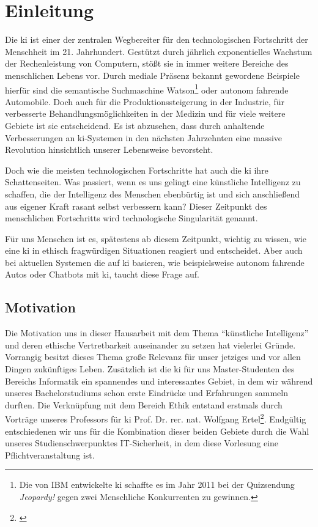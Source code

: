 \section{Einleitung}
Die \ac{ki} ist einer der zentralen Wegbereiter für den technologischen Fortschritt der Menschheit im 21. Jahrhundert.
Gestützt durch jährlich exponentielles Wachstum der Rechenleistung von Computern, stößt sie in immer weitere Bereiche des menschlichen Lebens vor.
Durch mediale Präsenz bekannt gewordene Beispiele hierfür sind die semantische Suchmaschine Watson\footnote{Die von IBM entwickelte \ac{ki} schaffte es im Jahr 2011 bei der Quizsendung \textit{Jeopardy!} gegen zwei Menschliche Konkurrenten zu gewinnen.} oder autonom fahrende Automobile. %
Doch auch für die Produktionssteigerung in der Industrie, für verbesserte Behandlungsmöglichkeiten in der Medizin und für viele weitere Gebiete ist sie entscheidend.
Es ist abzusehen, dass durch anhaltende Verbesserungen an \ac{ki}-Systemen in den nächsten Jahrzehnten eine massive Revolution hinsichtlich unserer Lebensweise bevorsteht.

Doch wie die meisten technologischen Fortschritte hat auch die \ac{ki} ihre Schattenseiten.
Was passiert, wenn es uns gelingt eine künstliche Intelligenz zu schaffen, die der Intelligenz des Menschen ebenbürtig ist und sich anschließend aus eigener Kraft rasant selbst verbessern kann?
Dieser Zeitpunkt des menschlichen Fortschritts wird technologische Singularität genannt.

Für uns Menschen ist es, spätestens ab diesem Zeitpunkt, wichtig zu wissen, wie eine \ac{ki} in ethisch fragwürdigen Situationen reagiert und entscheidet. Aber auch bei aktuellen Systemen die auf \ac{ki} basieren, wie beispielsweise autonom fahrende Autos oder Chatbots mit \ac{ki}, taucht diese Frage auf. 

\subsection{Motivation}
Die Motivation uns in dieser Hausarbeit mit dem Thema \enquote{künstliche Intelligenz} und deren ethische Vertretbarkeit auseinander zu setzen hat vielerlei Gründe. 
Vorrangig besitzt dieses Thema große Relevanz für unser jetziges und vor allen Dingen zukünftiges Leben. 
Zusätzlich ist die \ac{ki} für uns Master-Studenten des Bereichs Informatik ein spannendes und interessantes Gebiet, in dem wir während unseres Bachelorstudiums schon erste Eindrücke und Erfahrungen sammeln durften.
Die Verknüpfung mit dem Bereich Ethik entstand erstmals durch Vorträge unseres Professors für \ac{ki} Prof. Dr. rer. nat. Wolfgang Ertel\footnote{\cite{ProfessorErtel}}. Endgültig entschiedenen wir uns für die Kombination dieser beiden Gebiete durch die Wahl unseres Studienschwerpunktes IT-Sicherheit, in dem diese Vorlesung eine Pflichtveranstaltung ist.

